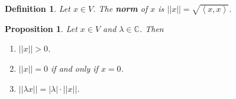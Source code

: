 \documentclass{article}
\theoremstyle{colontheorem}
\newtheorem{proposition}[theorem]{Proposition}
\newtheorem{definition}[theorem]{Definition}
\newenvironment{Proposition}
{
	\begin{mdframed}[backgroundcolor=TheoremOrange!10]
	\begin{proposition}
}
{
	\end{proposition}
	\end{mdframed}
	
	\vspace{.15in}
}
\newenvironment{Def}
{
	\begin{mdframed}[backgroundcolor=DefGreen!10]
	\begin{definition}
}
{
	\end{definition}
	\end{mdframed}
	
	\vspace{.15in}
}
\begin{document}
\begin{Def}
	
	Let $x \in V$. The \textbf{norm} of $x$ is $||x||= \sqrt{\left< x, x \right>}$.
	
\end{Def}



\begin{Proposition}
	Let $x \in V$ and $\lambda \in \mathbb{C}$. Then
	
	\begin{enumerate}
		
		\item $||x|| > 0$.
		
		\item $||x|| = 0$ if and only if $x = 0$.
		
		\item $||\lambda x|| = |\lambda| \cdot ||x||$.
		
	\end{enumerate}
	
\end{Proposition}
\end{document}
